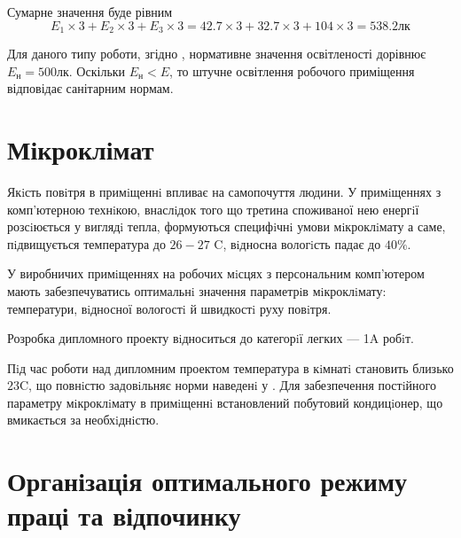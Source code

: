Сумарне значення буде рівним
\begin{equation*}
  E_1 \times 3 + E_2 \times 3 + E_3 \times 3
  = 42.7 \times 3 + 32.7 \times 3 + 104 \times 3
  = 538.2 \text{лк}
\end{equation*}

Для даного типу роботи, згідно \cite{DBN}, нормативне значення освітленості
дорівнює $E_{\text{н}} = 500$лк. 
Оскільки $E_{\text{н}} < E$, то штучне освітлення робочого приміщення
відповідає санітарним нормам.

\section{Мікроклімат}

Якiсть повiтря в примiщеннi впливає на самопочуття людини.
У примiщеннях з комп’ютерною технiкою, внаслiдок того що третина споживаної нею
енергiї розсiюється у виглядi тепла, формуються специфiчнi умови мiкроклiмату
а саме, пiдвищується температура до $26-27$ C,
вiдносна вологiсть падає до $40\%$.

У виробничих примiщеннях на робочих мiсцях з персональним комп’ютером мають
забезпечуватись оптимальнi значення параметрiв мiкроклiмату: температури,
вiдносної вологостi й швидкостi руху повiтря. \cite{DSanPiN}

Розробка дипломного проекту вiдноситься до категорiї легких --- 1A робiт.

Пiд час роботи над дипломним проектом температура в кiмнатi становить
близько $23$C, що повнiстю задовiльняє норми наведенi у \cite{DSN}.
Для забезпечення постiйного параметру мiкроклiмату в примiщеннi встановлений
побутовий кондицiонер, що вмикається за необхiднiстю.

\section{Організація оптимального режиму праці та відпочинку}

